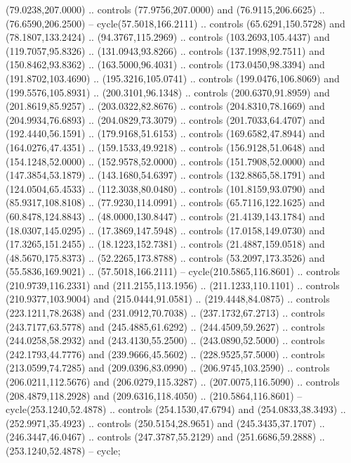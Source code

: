   (79.0238,207.0000) .. controls (77.9756,207.0000) and (76.9115,206.6625) ..
  (76.6590,206.2500) -- cycle(57.5018,166.2111) .. controls (65.6291,150.5728)
  and (78.1807,133.2424) .. (94.3767,115.2969) .. controls (103.2693,105.4437)
  and (119.7057,95.8326) .. (131.0943,93.8266) .. controls (137.1998,92.7511)
  and (150.8462,93.8362) .. (163.5000,96.4031) .. controls (173.0450,98.3394)
  and (191.8702,103.4690) .. (195.3216,105.0741) .. controls (199.0476,106.8069)
  and (199.5576,105.8931) .. (200.3101,96.1348) .. controls (200.6370,91.8959)
  and (201.8619,85.9257) .. (203.0322,82.8676) .. controls (204.8310,78.1669)
  and (204.9934,76.6893) .. (204.0829,73.3079) .. controls (201.7033,64.4707)
  and (192.4440,56.1591) .. (179.9168,51.6153) .. controls (169.6582,47.8944)
  and (164.0276,47.4351) .. (159.1533,49.9218) .. controls (156.9128,51.0648)
  and (154.1248,52.0000) .. (152.9578,52.0000) .. controls (151.7908,52.0000)
  and (147.3854,53.1879) .. (143.1680,54.6397) .. controls (132.8865,58.1791)
  and (124.0504,65.4533) .. (112.3038,80.0480) .. controls (101.8159,93.0790)
  and (85.9317,108.8108) .. (77.9230,114.0991) .. controls (65.7116,122.1625)
  and (60.8478,124.8843) .. (48.0000,130.8447) .. controls (21.4139,143.1784)
  and (18.0307,145.0295) .. (17.3869,147.5948) .. controls (17.0158,149.0730)
  and (17.3265,151.2455) .. (18.1223,152.7381) .. controls (21.4887,159.0518)
  and (48.5670,175.8373) .. (52.2265,173.8788) .. controls (53.2097,173.3526)
  and (55.5836,169.9021) .. (57.5018,166.2111) -- cycle(210.5865,116.8601) ..
  controls (210.9739,116.2331) and (211.2155,113.1956) .. (211.1233,110.1101) ..
  controls (210.9377,103.9004) and (215.0444,91.0581) .. (219.4448,84.0875) ..
  controls (223.1211,78.2638) and (231.0912,70.7038) .. (237.1732,67.2713) ..
  controls (243.7177,63.5778) and (245.4885,61.6292) .. (244.4509,59.2627) ..
  controls (244.0258,58.2932) and (243.4130,55.2500) .. (243.0890,52.5000) ..
  controls (242.1793,44.7776) and (239.9666,45.5602) .. (228.9525,57.5000) ..
  controls (213.0599,74.7285) and (209.0396,83.0990) .. (206.9745,103.2590) ..
  controls (206.0211,112.5676) and (206.0279,115.3287) .. (207.0075,116.5090) ..
  controls (208.4879,118.2928) and (209.6316,118.4050) .. (210.5864,116.8601) --
  cycle(253.1240,52.4878) .. controls (254.1530,47.6794) and (254.0833,38.3493)
  .. (252.9971,35.4923) .. controls (250.5154,28.9651) and (245.3435,37.1707) ..
  (246.3447,46.0467) .. controls (247.3787,55.2129) and (251.6686,59.2888) ..
  (253.1240,52.4878) -- cycle;

